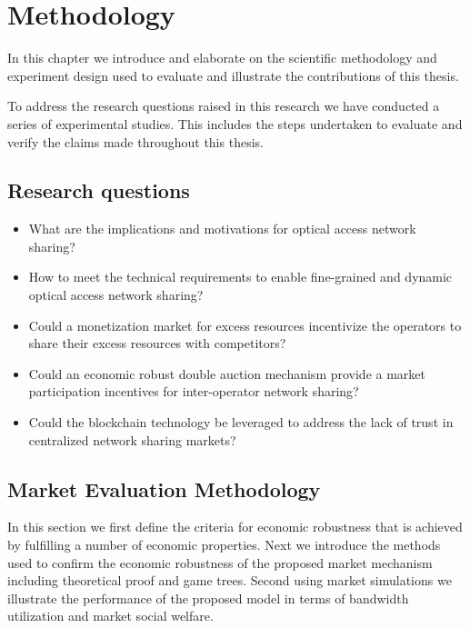 \chapter*{Methodology}
In this chapter we introduce and elaborate on the scientific methodology and experiment design used to evaluate and illustrate the contributions of this thesis.

To address the research questions raised in this research we have conducted a series of experimental studies. This includes the steps undertaken to evaluate and verify the claims made throughout this thesis. 

\newcommand{\RQa}{What are the implications and motivations for optical access network sharing?}
\newcommand{\RQb}{How to meet the technical requirements to enable fine-grained and dynamic optical access network sharing?}
\newcommand{\RQc}{Could a monetization market for excess resources incentivize the operators to share their excess resources with competitors?}
\newcommand{\RQd}{Could an economic robust double auction mechanism provide a market participation incentives for inter-operator network sharing?}
\newcommand{\RQe}{Could the blockchain technology be leveraged to address the lack of trust in centralized network sharing markets?}

\section{Research questions}
\begin{itemize}
\item \RQa
\item \RQb
\item \RQc
\item \RQd
\item \RQe



\end{itemize}

\section{Market Evaluation Methodology}
In this section we first define the criteria for economic robustness that is achieved by fulfilling a number of economic properties. Next we introduce the methods used to confirm the economic robustness of the proposed market mechanism including theoretical proof and game trees. Second using market simulations we illustrate the performance of the proposed model in terms of bandwidth utilization and market social welfare.


